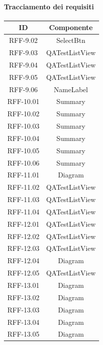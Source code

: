 \paragraph{Tracciamento dei requisiti}
\begin{tabularx}{\textwidth}{|c|c|}
    \hline
    \textbf{ID} & \textbf{Componente} \\
    \hline
        RFF-9.02 & SelectBtn \\
    \hline
        RFF-9.03 & QATestListView \\
    \hline
        RFF-9.04 & QATestListView \\
    \hline
        RFF-9.05 & QATestListView \\
    \hline
        RFF-9.06 & NameLabel \\
    \hline
        RFF-10.01 & Summary \\
    \hline
        RFF-10.02 & Summary \\
    \hline
        RFF-10.03 & Summary \\
    \hline
        RFF-10.04 & Summary \\
    \hline
        RFF-10.05 & Summary \\
    \hline
        RFF-10.06 & Summary \\
    \hline
        RFF-11.01 & Diagram \\
    \hline
        RFF-11.02 & QATestListView \\
    \hline
        RFF-11.03 & QATestListView \\
    \hline
        RFF-11.04 & QATestListView \\
    \hline
        RFF-12.01 & QATestListView \\
    \hline
        RFF-12.02 & QATestListView \\
    \hline
        RFF-12.03 & QATestListView \\
    \hline
        RFF-12.04 & Diagram \\
    \hline
        RFF-12.05 & QATestListView \\
    \hline
        RFF-13.01 & Diagram \\
    \hline
        RFF-13.02 & Diagram \\
    \hline
        RFF-13.03 & Diagram \\
    \hline
        RFF-13.04 & Diagram \\
    \hline
        RFF-13.05 & Diagram \\
    \hline
\end{tabularx}